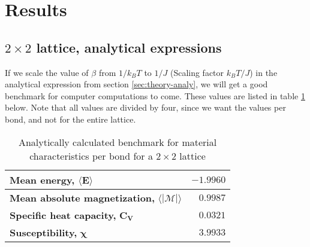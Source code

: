 \documentclass[../main.tex]{subfiles}
\begin{document}
\section{Results}
\subsection{$2 \times 2$ lattice, analytical expressions}
If we scale the value of $\beta$ from $1/k_BT$ to $1/J$ (Scaling factor $k_B T/J$) in the analytical expression from section \ref{sec:theory-analy}, we will get a good benchmark for computer computations to come. These values are listed in table \ref{tab:2x2spinsEnergiesMags} below. Note that all values are divided by four, since we want the values per bond, and not for the entire lattice.
\begin{table}[!h]
\begin{center}
  \begin{tabular}{| l | r |}
    \hline
    \textbf{Mean energy,} $\mathbf{\langle E \rangle}$ & $-1.9960$  \\
    \hline
    \textbf{Mean absolute magnetization,} $\mathbf{\langle |\mathcal{M}| \rangle}$ & $0.9987$ \\
    \hline
    \textbf{Specific heat capacity,} $\mathbf{C_V}$ & $0.0321$\\
    \hline
    \textbf{Susceptibility,} $\mathbf \chi$ & $3.9933$ \\
    \hline
  \end{tabular}
  \caption{Analytically calculated benchmark for material characteristics per bond for a $2 \times 2$ lattice}
  \label{tab:2x2spinsEnergiesMags}
\end{center}
\end{table}
\FloatBarrier
\end{document}
